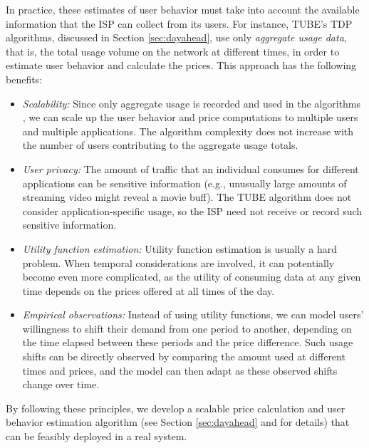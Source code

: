 In practice, these estimates of user behavior must take into account the available information that the ISP can collect from its users. For instance, TUBE's TDP algorithms, discussed in Section \ref{sec:dayahead}, use only \emph{aggregate usage data}, that is, the total usage volume on the network at different times, in order to estimate user behavior and calculate the prices. This approach has the following benefits:
\begin{itemize}
\item
\emph{Scalability:} Since only aggregate usage is recorded and used in the algorithms \cite{ha2012tube}, we can scale up the user behavior and price computations to multiple users and multiple applications. The algorithm complexity does not increase with the number of users contributing to the aggregate usage totals.
\item
\emph{User privacy:} The amount of traffic that an individual consumes for different applications can be sensitive information (e.g., unusually large amounts of streaming video might reveal a movie buff). The TUBE algorithm does not consider application-specific usage, so the ISP need not receive or record such sensitive information.
\item
\emph{Utility function estimation:} Utility function estimation is usually a hard problem. When temporal considerations are involved, it can potentially become even more complicated, as the utility of consuming data at any given time depends on the prices offered at all times of the day. %
\item
\emph{Empirical observations:} Instead of using utility functions, we can model users' willingness to shift their demand from one period to another, depending on the time elapsed between these periods and the price difference. Such usage shifts can be directly observed by comparing the amount used at different times and prices, and the model can then adapt as these observed shifts change over time.
\end{itemize}
By following these principles, we develop a scalable price calculation and user behavior estimation algorithm (see Section \ref{sec:dayahead} and \cite{ha2012tube} for details) that can be feasibly deployed in a real system.

